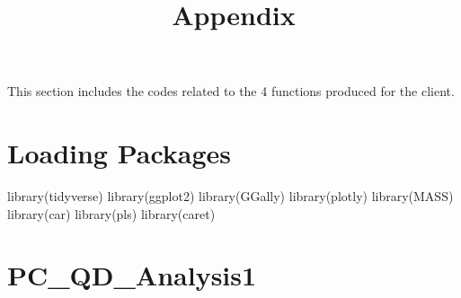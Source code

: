 \documentclass[
]{article}
\title{Appendix}
\author{}
\date{\vspace{-2.5em}}
\newenvironment{Shaded}{\begin{snugshade}}{\end{snugshade}}
\newcommand{\FunctionTok}[1]{\textcolor[rgb]{0.00,0.00,0.00}{#1}}
\newcommand{\NormalTok}[1]{#1}
\begin{document}
\maketitle

This section includes the codes related to the 4 functions produced for
the client.

\hypertarget{loading-packages}{%
\section{Loading Packages}\label{loading-packages}}

\begin{Shaded}
\begin{Highlighting}[]
\FunctionTok{library}\NormalTok{(tidyverse)}
\FunctionTok{library}\NormalTok{(ggplot2)}
\FunctionTok{library}\NormalTok{(GGally)}
\FunctionTok{library}\NormalTok{(plotly)}
\FunctionTok{library}\NormalTok{(MASS)}
\FunctionTok{library}\NormalTok{(car)}
\FunctionTok{library}\NormalTok{(pls)}
\FunctionTok{library}\NormalTok{(caret)}
\end{Highlighting}
\end{Shaded}

\hypertarget{pc_qd_analysis1}{%
\section{PC\_QD\_Analysis1}\label{pc_qd_analysis1}}
\end{document}
